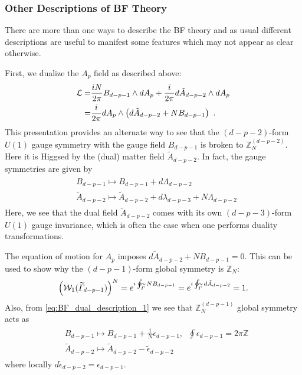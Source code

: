 \documentclass[11pt]{article}
\newcommand{\eq}[1]{\begin{align}\begin{split}#1\end{split}\end{align}}
\def\CL {{\cal L}}
\def\CW {{\cal W}}
\def\IZ{{\mathbb{Z}}}
\begin{document}
\subsubsection{Other Descriptions of BF Theory}
\label{subsubsec:other descriptions}

There are more than one ways to describe the BF theory and as usual different descriptions are useful to manifest some features which may not appear as clear otherwise. 

First, we dualize the $A_p$ field as described above:
%
\eq{
\CL =& \frac{iN}{2\pi} B_{d-p-1} \wedge d A_p + \frac{i}{2\pi} d \tilde{A}_{d-p-2} \wedge dA_{p} \\
=& \frac{i}{2\pi} dA_{p} \wedge \left( d \tilde{A}_{d-p-2} + N B_{d-p-1} \right)~.
\label{eq:BF_dual_description_1}
}
%
 This presentation provides an alternate way to see that the $(d-p-2)$-form $U(1)$ gauge symmetry with the gauge field $B_{d-p-1}$ is broken to $\IZ_{N}^{(d-p-2)}$. Here it is Higgsed by the (dual) matter field $\tilde{A}_{d-p-2}$. In fact, the gauge symmetries are given by
%
\eq{
& B_{d-p-1} \mapsto B_{d-p-1} + d \Lambda_{d-p-2} \\
& \tilde{A}_{d-p-2} \mapsto \tilde{A}_{d-p-2} + d \lambda_{d-p-3} + N \Lambda_{d-p-2} 
}
%
Here, we see that the dual field $\tilde{A}_{d-p-2}$ comes with its own $(d-p-3)$-form $U(1)$ gauge invariance, which is often the case when one performs duality transformations.

The equation of motion for $A_{p}$ imposes $d \tilde{A}_{d-p-2} + N B_{d-p-1} = 0$. This can be used to show why the $(d-p-1)$-form global symmetry is $\IZ_N$:
%
\eq{
\left( \CW_1(\widetilde\Gamma_{d-p-1}) \right)^N = e^{i \oint_{\widetilde\Gamma} N B_{d-p-1}} = e^{i \oint_{\widetilde\Gamma} d \tilde{A}_{d-p-2}} = 1.
}
%
Also, from \eqref{eq:BF_dual_description_1} we see that $\IZ_N^{(d-p-1)}$ global symmetry acts as
%
\eq{
&B_{d-p-1} \mapsto B_{d-p-1} + \frac{1}{N} \epsilon_{d-p-1}, \;\; \oint \epsilon_{d-p-1} = 2\pi \IZ \\
& \tilde{A}_{d-p-2} \mapsto \tilde{A}_{d-p-2} - \tilde{\epsilon}_{d-p-2}
}
%
where locally $d \tilde{\epsilon}_{d-p-2} = \epsilon_{d-p-1}$.
\end{document}
